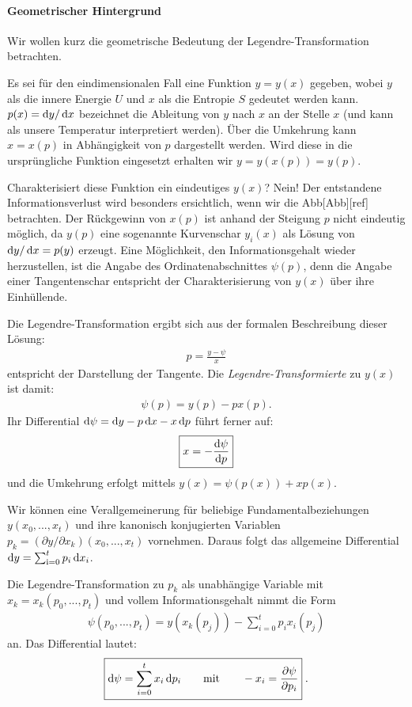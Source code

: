 \paragraph*{Geometrischer Hintergrund}
Wir wollen kurz die geometrische Bedeutung der Legendre-Transformation betrachten. 

Es sei für den  eindimensionalen Fall eine Funktion $y=y(x)$ gegeben, wobei $y$ als die innere Energie $U$ und $x$ als die Entropie $S$ gedeutet werden kann. $p(x)=\mathop{}\!\mathrm{d} y/ \mathop{}\!\mathrm{d} x$ bezeichnet die Ableitung von $y$ nach $x$ an der Stelle $x$ (und kann als unsere Temperatur interpretiert werden). Über die Umkehrung kann $x=x(p)$ in Abhängigkeit von $p$ dargestellt werden. Wird diese in die ursprüngliche Funktion eingesetzt erhalten wir $y=y(x(p))=y(p)$. 

Charakterisiert diese Funktion ein eindeutiges $y(x)$? Nein! Der entstandene Informationsverlust wird besonders ersichtlich, wenn wir die Abb[Abb][ref] betrachten. Der Rückgewinn von $x(p)$ ist anhand der Steigung $p$ nicht eindeutig möglich, da $y(p)$ eine sogenannte Kurvenschar $y_i(x)$ als Lösung von $\mathop{}\!\mathrm{d} y/\mathop{}\!\mathrm{d} x=p(y)$ erzeugt. Eine Möglichkeit, den Informationsgehalt wieder herzustellen, ist die Angabe des Ordinatenabschnittes $\psi(p)$, denn die Angabe einer Tangentenschar entspricht der Charakterisierung von $y(x)$ über ihre Einhüllende. 

Die Legendre-Transformation ergibt sich aus der formalen Beschreibung dieser Lösung: 
\begin{align*}
    p=\frac{y-\psi}{x}
\end{align*}
entspricht der Darstellung der Tangente.
Die \emph{Legendre-Transformierte} zu $y(x)$ ist damit:
\begin{align*}
    \boxed{\psi(p)=y(p)-px(p)}.
\end{align*}
Ihr Differential $\mathop{}\!\mathrm{d} \psi=\mathop{}\!\mathrm{d} y-p\mathop{}\!\mathrm{d} x-x\mathop{}\!\mathrm{d} p$ führt ferner auf:
\begin{align*}
    \boxed{x=-\frac{\mathop{}\!\mathrm{d} \psi}{\mathop{}\!\mathrm{d} p}}
\end{align*}
und die Umkehrung erfolgt mittels $y(x)=\psi(p(x))+xp(x)$.

Wir können eine Verallgemeinerung für beliebige Fundamentalbeziehungen $y(x_0,...,x_t)$ und ihre kanonisch konjugierten Variablen $p_k=(\partial y/\partial x_k)(x_0,...,x_t)$ vornehmen.
Daraus folgt das allgemeine Differential $\mathop{}\!\mathrm{d} y=\sum_\mathrm{i=0}^tp_i\mathop{}\!\mathrm{d} x_i$. 
\begin{formal}
    Die Legendre-Transformation zu $p_k$ als unabhängige Variable mit $x_k=x_k(p_0,...,p_t)$ und vollem Informationsgehalt nimmt die Form 
\begin{align*}
    \boxed{\psi(p_0,...,p_t)=y(x_k(p_j))-\sum^t_{i=0}p_ix_i(p_j)}
\end{align*}
an. Das Differential lautet:
\begin{align*}
    \boxed{\mathop{}\!\mathrm{d} \psi=\sum^t_{i=0}x_i\mathop{}\!\mathrm{d} p_i \qquad \mathrm{mit}\qquad -x_i=\frac{\partial \psi}{\partial p_i}}\;.
\end{align*}
\end{formal}


